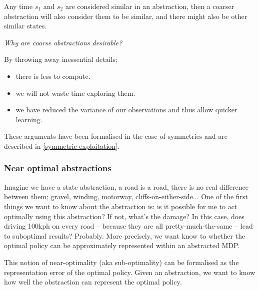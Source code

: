 Any time $s_1$ and $s_2$ are considered similar in an abstraction, then a coarser
abstraction will also consider them to be similar, and there might also be other similar states. \footnotemark[25]


\begin{displayquote}
\textit{Why are coarse abstractions desirable?}
\end{displayquote}

By throwing away inessential details;
\begin{itemize}
  \tightlist
  \item there is less to compute.
  \item we will not waste time exploring them.
  \item we have reduced the variance of our observations and thus allow quicker learning.
\end{itemize}

These arguments have been formalised in the case of symmetries and are described in \ref{symmetric-exploitation}.


\subsubsection{Near optimal abstractions}

Imagine we have a state abstraction, a road is a road, there is no real difference
between them; gravel, winding, motorway, cliffs-on-either-side...
One of the first things we want to know about the abstraction is:
is it possible for me to act optimally
using this abstraction? If not, what's the damage? In this case, does driving 100kph on every road --
because they are all pretty-much-the-same -- lead to suboptimal results? Probably.
More precisely, we want know to whether the optimal policy can be approximately represented within an abstracted MDP.

This notion of near-optimality (aka sub-optimality) can be formalised as the representation error of the optimal
policy. \cite{Abel2017} Given an abstraction, we want to know how well the abstraction can represent the optimal policy.

